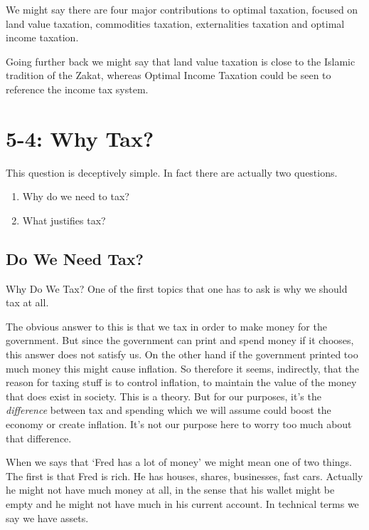 \documentclass[]{tufte-handout}
\providecommand{\tightlist}{%
  \setlength{\itemsep}{0pt}\setlength{\parskip}{0pt}}
\begin{document}
We might say there are four major contributions to optimal taxation,
focused on land value taxation, commodities taxation, externalities
taxation and optimal income taxation.

Going further back we might say that land value taxation is close to the
Islamic tradition of the Zakat, whereas Optimal Income Taxation could be
seen to reference the income tax system.

\hypertarget{why-tax}{%
\section{5-4: Why Tax?}\label{why-tax}}

This question is deceptively simple. In fact there are actually two
questions.

\begin{enumerate}
\def\labelenumi{\arabic{enumi}.}
\tightlist
\item
  Why do we need to tax?
\item
  What justifies tax?
\end{enumerate}

\hypertarget{do-we-need-tax}{%
\subsection{Do We Need Tax?}\label{do-we-need-tax}}

Why Do We Tax? One of the first topics that one has to ask is why we
should tax at all.

The obvious answer to this is that we tax in order to make money for the
government. But since the government can print and spend money if it
chooses, this answer does not satisfy us. On the other hand if the
government printed too much money this might cause inflation. So
therefore it seems, indirectly, that the reason for taxing stuff is to
control inflation, to maintain the value of the money that does exist in
society. This is a theory. But for our purposes, it's the
\emph{difference} between tax and spending which we will assume could
boost the economy or create inflation. It's not our purpose here to
worry too much about that difference.

When we says that `Fred has a lot of money' we might mean one of two
things. The first is that Fred is rich. He has houses, shares,
businesses, fast cars. Actually he might not have much money at all, in
the sense that his wallet might be empty and he might not have much in
his current account. In technical terms we say we have assets.
\end{document}
